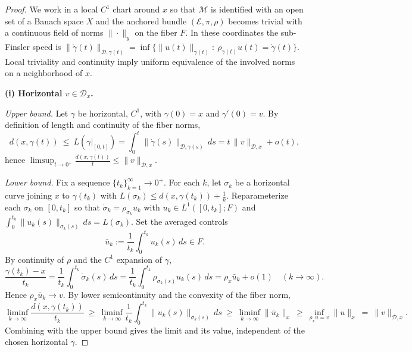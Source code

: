 \documentclass[12pt]{amsart}
\numberwithin{equation}{section}
\theoremstyle{remark}
\begin{document}
\begin{proof}
We work in a local $C^1$ chart around $x$ so that $\mathcal M$ is identified with an open set of a Banach space $X$ and the anchored bundle $(\mathcal E,\pi,\rho)$ becomes trivial with a continuous field of norms $\|\cdot\|_y$ on the fiber $F$.
In these coordinates the sub-Finsler speed is
$\|\dot\gamma(t)\|_{\mathcal D,\gamma(t)}=\inf\{\|u(t)\|_{\gamma(t)}:\ \rho_{\gamma(t)}u(t)=\dot\gamma(t)\}$.
Local triviality and continuity imply uniform equivalence of the involved norms on a neighborhood of $x$.

\medskip\noindent
\textbf{(i) Horizontal $v\in\mathcal D_x$. }

\emph{Upper bound.}
Let $\gamma$ be horizontal, $C^1$, with $\gamma(0)=x$ and $\gamma'(0)=v$.
By definition of length and continuity of the fiber norms,
\begin{equation}
d(x,\gamma(t))\ \le\ L(\gamma|_{[0,t]})
=\int_0^t \|\dot\gamma(s)\|_{\mathcal D,\gamma(s)}\,ds
= t\,\|v\|_{\mathcal D,x}+o(t),
\end{equation}
hence $\displaystyle \limsup_{t\to 0^+}\frac{d(x,\gamma(t))}{t}\le \|v\|_{\mathcal D,x}$.

\smallskip\noindent
\emph{Lower bound.}
Fix a sequence $\{t_k\}_{k=1}^\infty \to 0^+$.
For each $k$, let $\sigma_k$ be a horizontal curve joining $x$ to $\gamma(t_k)$ with
$L(\sigma_k)\le d(x,\gamma(t_k))+\tfrac1k$.
Reparameterize each $\sigma_k$ on $[0,t_k]$ so that $\dot\sigma_k=\rho_{\sigma_k} u_k$ with $u_k\in L^1([0,t_k];F)$ and
$\int_0^{t_k}\|u_k(s)\|_{\sigma_k(s)}\,ds=L(\sigma_k)$.
Set the averaged controls
\begin{equation}
\bar u_k:=\frac1{t_k}\int_0^{t_k} u_k(s)\,ds\in F.
\end{equation}
By continuity of $\rho$ and the $C^1$ expansion of $\gamma$,
\begin{equation}
\frac{\gamma(t_k)-x}{t_k}
=\frac1{t_k}\int_0^{t_k}\dot\sigma_k(s)\,ds
=\frac1{t_k}\int_0^{t_k}\rho_{\sigma_k(s)}u_k(s)\,ds
=\rho_x \bar u_k + o(1)\quad (k\to\infty).
\end{equation}
Hence $\rho_x \bar u_k\to v$. By lower semicontinuity and the convexity of the fiber norm,
\begin{equation}
\liminf_{k\to\infty}\frac{d(x,\gamma(t_k))}{t_k}
\ \ge\ \liminf_{k\to\infty}\frac1{t_k}\int_0^{t_k}\|u_k(s)\|_{\sigma_k(s)}\,ds
\ \ge\ \liminf_{k\to\infty}\|\bar u_k\|_{x}
\ \ge\ \inf_{\rho_x u=v}\|u\|_{x}
\ =\ \|v\|_{\mathcal D,x}.
\end{equation}
Combining with the upper bound gives the limit and its value, independent of the chosen horizontal $\gamma$.


\end{proof}
\end{document}
